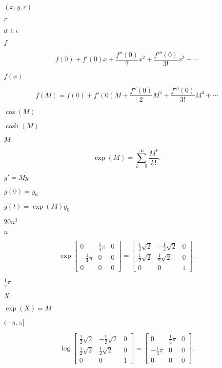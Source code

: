 \documentclass{article}
\begin{document}
$(x,y,r)$
\pagebreak

$r$
\pagebreak

$d\pm\epsilon$
\pagebreak

$ f $
\pagebreak

\[ f(0) + f'(0) x + \frac{f''(0)}{2} x^2 + \frac{f'''(0)}{3!} x^3 + \cdots \]
\pagebreak

$ f(x) $
\pagebreak

\[ f(M) = f(0) + f'(0) M + \frac{f''(0)}{2} M^2 + \frac{f'''(0)}{3!} M^3 + \cdots \]
\pagebreak

$ \cos(M) $
\pagebreak

$ \cosh(M) $
\pagebreak

$ M $
\pagebreak

\[ \exp(M) = \sum_{k=0}^\infty \frac{M^k}{k!}. \]
\pagebreak

$ y' = My $
\pagebreak

$ y(0) = y_0 $
\pagebreak

$ y(t) = \exp(M) y_0 $
\pagebreak

$ 20 n^3 $
\pagebreak

$ n $
\pagebreak

\[ \exp \left[ \begin{array}{ccc} 0 & \frac14\pi & 0 \\ -\frac14\pi & 0 & 0 \\ 0 & 0 & 0 \end{array} \right] = \left[ \begin{array}{ccc} \frac12\sqrt2 & -\frac12\sqrt2 & 0 \\ \frac12\sqrt2 & \frac12\sqrt2 & 0 \\ 0 & 0 & 1 \end{array} \right]. \]
\pagebreak

$ \frac14\pi $
\pagebreak

$ X $
\pagebreak

$ \exp(X) = M $
\pagebreak

$ (-\pi,\pi] $
\pagebreak

\[ \log \left[ \begin{array}{ccc} \frac12\sqrt2 & -\frac12\sqrt2 & 0 \\ \frac12\sqrt2 & \frac12\sqrt2 & 0 \\ 0 & 0 & 1 \end{array} \right] = \left[ \begin{array}{ccc} 0 & \frac14\pi & 0 \\ -\frac14\pi & 0 & 0 \\ 0 & 0 & 0 \end{array} \right]. \]
\pagebreak
\end{document}
